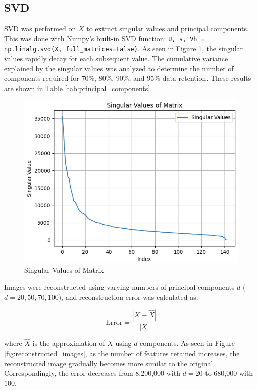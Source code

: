 \documentclass[conference]{IEEEtran}
\begin{document}
\subsection{SVD}
SVD was performed on $X$ to extract singular values and principal components. This was done with Numpy's built-in SVD function: \texttt{U, s, Vh = np.linalg.svd(X, full\_matrices=False)}. As seen in Figure \ref{fig:svd_components}, the singular values rapidly decay for each subsequent value. The cumulative variance explained by the singular values was analyzed to determine the number of components required for 70\%, 80\%, 90\%, and 95\% data retention. These results are shown in Table \ref{tab:principal_components}.

\begin{figure}[htbp]
  \centerline{\includegraphics[scale=0.4]{figures/svd_components.png}}
  \caption{Singular Values of Matrix}
  \label{fig:svd_components}
\end{figure}  

Images were reconstructed using varying numbers of principal components $d$ ($d=20,50,70,100$), and reconstruction error was calculated as: 

\[\text{Error} = \frac{|X - \hat{X}|}{|X|}\]

where $\hat{X}$ is the approximation of $X$ using $d$ components. As seen in Figure \ref{fig:reconstructed_images}, as the number of features retained increases, the reconstructed image gradually becomes more similar to the original. Correspondingly, the error decreases from 8,200,000 with $d=20$ to 680,000 with $100$.
\end{document}
